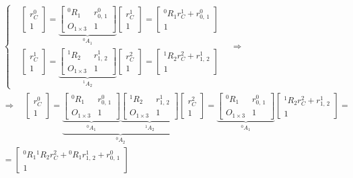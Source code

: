 \begin{multline}
	\left\{
	\begin{aligned}
		\!&\begin{bmatrix}r^0_C \\ 1\end{bmatrix} = \underbrace{\begin{bmatrix} {}^{0}R_1 & r^{0}_{0,\,1}\\ O_{1 \times 3} & 1 \end{bmatrix}}_{{}^{0}A_1}\begin{bmatrix}r^1_C \\ 1\end{bmatrix} = \begin{bmatrix}{}^{0}R_1 r^1_C + r^{0}_{0,\,1} \\ 1\end{bmatrix}\\
		\!&\begin{bmatrix}r^1_C \\ 1\end{bmatrix} = \underbrace{\begin{bmatrix} {}^{1}R_2 & r^{1}_{1,\,2}\\ O_{1 \times 3} & 1 \end{bmatrix}}_{{}^{1}A_2}\begin{bmatrix}r^2_C \\ 1\end{bmatrix} = \begin{bmatrix}{}^{1}R_2 r^2_C + r^{1}_{1,\,2} \\ 1\end{bmatrix}
	\end{aligned}
	\right.
	\quad \Rightarrow
	\\
	\Rightarrow \quad
	\begin{bmatrix}r^0_C \\ 1\end{bmatrix} = \underbrace{\underbrace{\begin{bmatrix} {}^{0}R_1 & r^{0}_{0,\,1}\\ O_{1 \times 3} & 1 \end{bmatrix}}_{{}^{0}A_1}\underbrace{\begin{bmatrix} {}^{1}R_2 & r^{1}_{1,\,2}\\ O_{1 \times 3} & 1 \end{bmatrix}}_{{}^{1}A_2}}_{{}^{0}A_2} \begin{bmatrix}r^2_C \\ 1\end{bmatrix} = \underbrace{\begin{bmatrix} {}^{0}R_1 & r^{0}_{0,\,1}\\ O_{1 \times 3} & 1 \end{bmatrix}}_{{}^{0}A_1} \begin{bmatrix}{}^{1}R_2 r^2_C + r^{1}_{1,\,2} \\ 1\end{bmatrix} =\\
	= \begin{bmatrix}{}^{0}R_1{}^{1}R_2 r^2_C + {}^{0}R_1 r^{1}_{1,\,2} + r^{0}_{0,\,1} \\ 1\end{bmatrix}
\end{multline}

